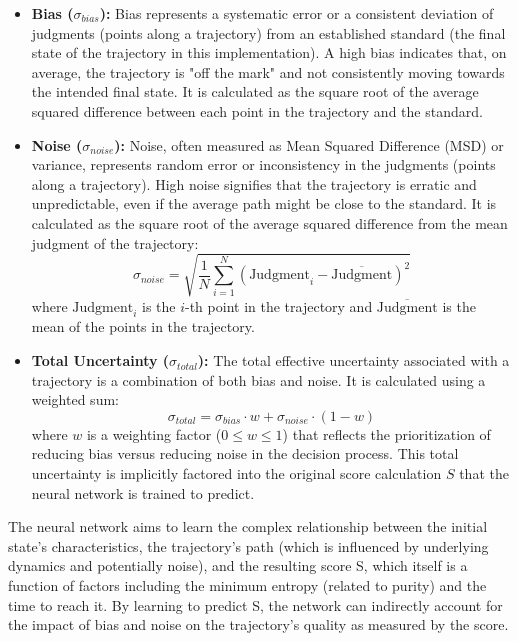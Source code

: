 \documentclass{article}
\begin{document}
\begin{itemize} \item \textbf{Bias ($\sigma_{bias}$):} Bias represents a systematic error or a consistent deviation of judgments (points along a trajectory) from an established standard (the final state of the trajectory in this implementation). A high bias indicates that, on average, the trajectory is "off the mark" and not consistently moving towards the intended final state. It is calculated as the square root of the average squared difference between each point in the trajectory and the standard.

\item \textbf{Noise ($\sigma_{noise}$):} Noise, often measured as Mean Squared Difference (MSD) or variance, represents random error or inconsistency in the judgments (points along a trajectory). High noise signifies that the trajectory is erratic and unpredictable, even if the average path might be close to the standard. It is calculated as the square root of the average squared difference from the mean judgment of the trajectory:
$$ \sigma_{noise} = \sqrt{\frac{1}{N} \sum_{i=1}^{N} (\text{Judgment}_i - \overline{\text{Judgment}})^2} $$
where $\text{Judgment}_i$ is the $i$-th point in the trajectory and $\overline{\text{Judgment}}$ is the mean of the points in the trajectory.

\item \textbf{Total Uncertainty ($\sigma_{total}$):} The total effective uncertainty associated with a trajectory is a combination of both bias and noise. It is calculated using a weighted sum:
$$ \sigma_{total} = \sigma_{bias} \cdot w + \sigma_{noise} \cdot (1 - w) $$
where $w$ is a weighting factor ($0 \le w \le 1$) that reflects the prioritization of reducing bias versus reducing noise in the decision process. This total uncertainty is implicitly factored into the original score calculation $S$ that the neural network is trained to predict.

\end{itemize}

The neural network aims to learn the complex relationship between the initial state's characteristics, the trajectory's path (which is influenced by underlying dynamics and potentially noise), and the resulting score S, which itself is a function of factors including the minimum entropy (related to purity) and the time to reach it. By learning to predict S, the network can indirectly account for the impact of bias and noise on the trajectory's quality as measured by the score.
\newpage
\end{document}
